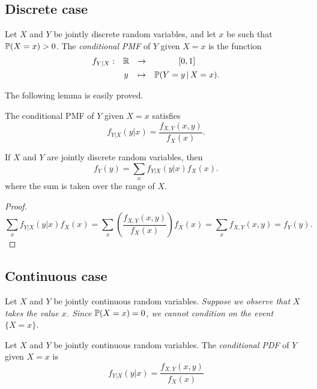 \subsection{Discrete case}
\begin{definition}
Let $X$ and $Y$ be jointly discrete random variables, and let $x$ be such that $\mathbb{P}(X=x)>0$.
The \emph{conditional PMF} of $Y$ given $X=x$ is the function
\[
\begin{array}{cccc}
f_{Y|X}	:	& \mathbb{R}		& \to		& [0,1] \\[1ex]
			& y 		& \mapsto	& \mathbb{P}(Y=y \,|\, X=x).
\end{array}
\]
\end{definition}

The following lemma is easily proved.
\begin{lemma}
The conditional PMF of $Y$ given $X=x$ satisfies
\[
f_{Y|X}(y|x) = \frac{f_{X,Y}(x,y)}{f_X(x)}.
\]
\end{lemma}

\begin{theorem}%
If $X$ and $Y$ are jointly discrete random variables, then 
\[
\displaystyle f_Y(y) = \sum_x f_{Y|X}(y|x) f_X(x).
\]
where the sum is taken over the range of $X$.
\end{theorem}
\begin{proof}
\[
\sum_x f_{Y|X}(y|x) f_X(x) 
	= \sum_x \left(\frac{f_{X,Y}(x,y)}{f_X(x)}\right) f_X(x)
	= \sum_x f_{X,Y}(x,y)
	= f_Y(y).
\]
\end{proof}

\subsection{Continuous case}
Let $X$ and $Y$ be jointly continuous random variables.
\bit
\it Suppose we observe that $X$ takes the value $x$.
\it Since $\mathbb{P}(X=x)=0$, we cannot condition on the event $\{X=x\}$.
\eit

\begin{definition}\label{def:conditional_density}
Let $X$ and $Y$ be jointly continuous random variables. The \emph{conditional PDF} of $Y$ given $X=x$ is 
\[
f_{Y|X}(y|x) = \frac{f_{X,Y}(x,y)}{f_X(x)}
\]
\end{definition}

